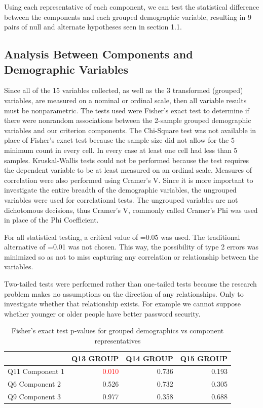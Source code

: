 \documentclass[letterpaper, 10 pt, conference]{ieeeconf}  %
\begin{document}
Using each representative of each component, we can test the statistical difference between the components and each grouped demographic variable, resulting in 9 pairs of null and alternate hypotheses seen in section 1.1.

\subsection{Analysis Between Components and Demographic Variables}

Since all of the 15 variables collected, as well as the 3 transformed (grouped) variables, are measured on a nominal or ordinal scale, then all variable results must be nonparametric. The tests used were Fisher’s exact test to determine if there were nonrandom associations between the 2-sample grouped demographic variables and our criterion components. The Chi-Square test was not available in place of Fisher’s exact test because the sample size did not allow for the 5-minimum count in every cell. In every case at least one cell had less than 5 samples. Kruskal-Wallis tests could not be performed because the test requires the dependent variable to be at least measured on an ordinal scale. Measures of correlation were also performed using Cramer’s V. Since it is more important to investigate the entire breadth of the demographic variables, the ungrouped variables were used for correlational tests. The ungrouped variables are not dichotomous decisions, thus Cramer’s V, commonly called Cramer’s Phi was used in place of the Phi Coefficient. 

For all statistical testing, a critical value of \textalpha{}=0.05 was used. The traditional alternative of \textalpha{}=0.01 was not chosen. This way, the possibility of type 2 errors was minimized so as not to miss capturing any correlation or relationship between the variables. 

Two-tailed tests were performed rather than one-tailed tests because the research problem makes no assumptions on the direction of any relationships. Only to investigate whether that relationship exists. For example we cannot suppose whether younger or older people have better password security.

\begin{table}[h]
\caption{Fisher's exact test p-values for grouped demographics vs component representatives}
\label{tab:fisher}
\begin{center}
\begin{tabular}{lrrr}
\hline
                & Q13 GROUP & Q14 GROUP & Q15 GROUP \\ \hline
Q11 Component 1 & \textcolor{red}{0.010}       & 0.736       & 0.193       \\ \hline
Q6 Component 2  & 0.526       & 0.732       & 0.305       \\ \hline
Q9 Component 3  & 0.977       & 0.358       & 0.688       \\ \hline
\end{tabular}
\end{center}
\end{table}
\end{document}
